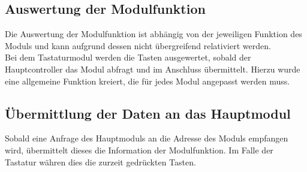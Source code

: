 \newpage
\subsection{Auswertung der Modulfunktion}
\textmd{Die Auswertung der Modulfunktion ist abhängig von der jeweiligen Funktion des Moduls und kann aufgrund dessen nicht übergreifend relativiert werden.\\
Bei dem Tastaturmodul werden die Tasten ausgewertet, sobald der Hauptcontroller das Modul abfragt und im Anschluss übermittelt. Hierzu wurde eine allgemeine Funktion kreiert, die für jedes Modul angepasst werden muss.
}



\subsection{Übermittlung der Daten an das Hauptmodul}
\textmd{Sobald eine Anfrage des Hauptmoduls an die Adresse des Moduls empfangen wird, übermittelt dieses die Information der Modulfunktion. Im Falle der Tastatur währen dies die zurzeit gedrückten Tasten.
}



